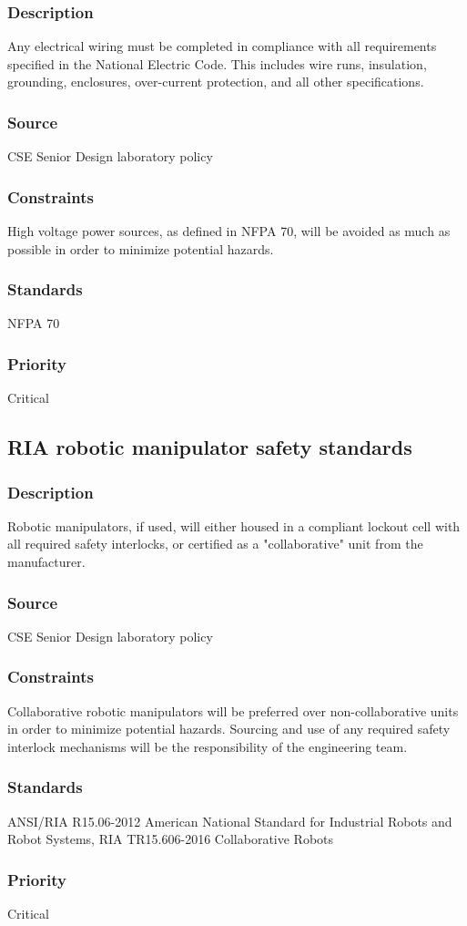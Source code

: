 \subsubsection{Description}
Any electrical wiring must be completed in compliance with all requirements specified in the National Electric Code. This includes wire runs, insulation, grounding, enclosures, over-current protection, and all other specifications.
\subsubsection{Source}
CSE Senior Design laboratory policy
\subsubsection{Constraints}
High voltage power sources, as defined in NFPA 70, will be avoided as much as possible in order to minimize potential hazards.
\subsubsection{Standards}
NFPA 70
\subsubsection{Priority}
Critical

\subsection{RIA robotic manipulator safety standards}
\subsubsection{Description}
Robotic manipulators, if used, will either housed in a compliant lockout cell with all required safety interlocks, or certified as a "collaborative" unit from the manufacturer.
\subsubsection{Source}
CSE Senior Design laboratory policy
\subsubsection{Constraints}
Collaborative robotic manipulators will be preferred over non-collaborative units in order to minimize potential hazards. Sourcing and use of any required safety interlock mechanisms will be the responsibility of the engineering team.
\subsubsection{Standards}
ANSI/RIA R15.06-2012 American National Standard for Industrial Robots and Robot Systems, RIA TR15.606-2016 Collaborative Robots
\subsubsection{Priority}
Critical
